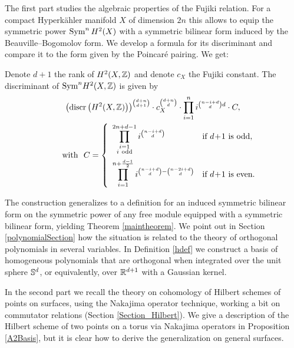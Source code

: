 The first part \cite{Kapfer} studies the algebraic properties of the Fujiki relation. For a compact Hyperk\"ahler manifold $X$ of dimension $2n$ this allows to equip the symmetric power $\Sym^nH^2(X)$ with a symmetric bilinear form induced by the Beauville--Bogomolov form. We develop a formula for its discriminant and compare it to the form given by the Poincar\'e pairing.
We get:
\begin{theorem}
Denote $d+1$ the rank of $H^2(X,\Z)$ and denote $c_X$ the Fujiki constant.
The discriminant of $\Sym^n\!H^2(X,\Z)$ is given by
\begin{gather*}
\left(\discr \left(H^2(X,\Z)\right)\right)^{\binom{d+n}{d+1}}\cdot c_X^{\binom{d+n}{d}} \cdot \prod_{i=1}^n i^{\binom{n-i+d}{d}d} 
\cdot C, \\
\qquad \text{with } \ 
C=
\left\{
 \begin{array}{*2{l}p{5cm}}
 \displaystyle\prod_{\substack{i=1 \\ i\ \text{odd}\\\ }}^{2n+d-1}i^{\binom{n-i+d}{d}} &\text{if }d\!+\! 1\text{ is odd}, \\
 \displaystyle\prod_{i=1}^{n+\frac{d-1}{2}} i^{\binom{n-i+d}{d} - \binom{n-2i+d}{d}} &\text{if }d\! +\! 1\text{ is even}.
\end{array}
\right.
\end{gather*}
\end{theorem}
The construction generalizes to a definition for an induced symmetric bilinear form on the symmetric power of any free module equipped with a symmetric bilinear form, yielding Theorem \ref{maintheorem}. We point out in Section \ref{polynomialSection} how the situation is related to the theory of orthogonal polynomials in several variables.
In Definition \ref{hdef} we construct a basis of homogeneous polynomials that are orthogonal when integrated over the unit sphere $\S^d$, or equivalently, over $\R^{d+1}$ with a Gaussian kernel.

In the second part we recall the theory on cohomology of Hilbert schemes of points on surfaces, using the Nakajima operator technique, working a bit on commutator relations (Section \ref{Section_Hilbert}).
We give a description of the Hilbert scheme of two points on a torus via Nakajima operators in Proposition \ref{A2Basis}, but it is clear how to derive the generalization on general surfaces.

